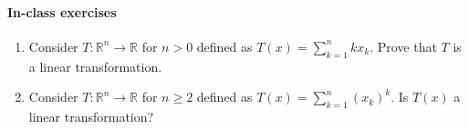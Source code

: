 \documentclass{article}
\begin{document}
\paragraph{In-class exercises}

\begin{enumerate}
    \item Consider $T : \mathbb R^n \to \mathbb R$ for $n > 0$ defined as $T(x) = \sum\limits_{k=1}^n k x_k$.
    Prove that $T$ is a linear transformation.
    \item Consider $T : \mathbb R^n \to \mathbb R$ for $n \geq 2$ defined as $T(x) = \sum\limits_{k=1}^n (x_k)^k$.
    Is $T(x)$ a linear transformation?
\end{enumerate}
\end{document}

